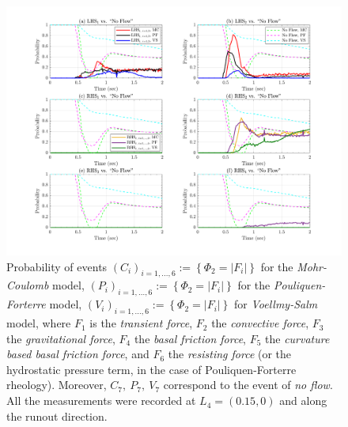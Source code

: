 \documentclass{article}
\begin{document}
\begin{figure}[H]
        \centering
        \includegraphics[width=1\textwidth]{InclinedPlane/LocalRecords/DominancePrX_L4.png}
        \caption{Probability of events $(C_i)_{i=1,...,6}:=\left\{\Phi_2=|F_i|\right\}$ for the \emph{Mohr-Coulomb} model, $(P_i)_{i=1,...,6}:=\left\{\Phi_2=|F_i|\right\}$ for the \emph{Pouliquen-Forterre} model, $(V_i)_{i=1,...,6}:=\left\{\Phi_2=|F_i|\right\}$ for \emph{Voellmy-Salm} model, where $F_1$ is the \emph{transient force}, $F_2$ the \emph{convective force}, $F_3$ the \emph{gravitational force}, $F_4$ the \emph{basal friction force}, $F_5$ the \emph{curvature based basal friction force}, and $F_6$ the \emph{resisting force} (or the hydrostatic pressure term, in the case of Pouliquen-Forterre rheology). Moreover, $C_7,\ P_7,\ V_7$ correspond to the event of \emph{no flow}. All the measurements were recorded at $L_4=(0.15,0)$ and along the runout direction.}
        \label{fig:Ramp-FXDominance-L4}
\end{figure}
\end{document}

